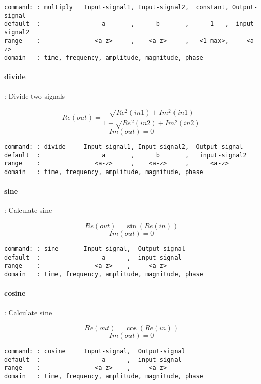 \documentclass{report}
\newcommand{\bc}{\scriptsize}
\newcommand{\ec}{\normalsize}
\begin{document}
\bc
\begin{verbatim}
command: : multiply   Input-signal1, Input-signal2,  constant, Output-signal
default  :                 a       ,      b       ,      1   ,  input-signal2
range    :               <a-z>     ,    <a-z>     ,   <1-max>,     <a-z>
domain   : time, frequency, amplitude, magnitude, phase
\end{verbatim}
\ec

\paragraph{divide}: Divide two signals

\[ Re(out) = \frac{\sqrt{ Re^{2}(in1) + Im^{2}(in1)} }{ 1 + \sqrt{Re^{2}(in2) + Im^{2}(in2)}} \]
\[ Im(out) = 0 \]

\bc
\begin{verbatim}
command: : divide     Input-signal1, Input-signal2,  Output-signal
default  :                 a       ,      b       ,   input-signal2
range    :               <a-z>     ,    <a-z>     ,      <a-z>
domain   : time, frequency, amplitude, magnitude, phase
\end{verbatim}
\ec

\paragraph{sine}: Calculate sine

\[ Re(out) = \sin (Re(in)) \]
\[ Im(out) = 0 \]

\bc
\begin{verbatim}
command: : sine       Input-signal,  Output-signal
default  :                 a      ,  input-signal 
range    :               <a-z>    ,     <a-z>
domain   : time, frequency, amplitude, magnitude, phase
\end{verbatim}
\ec

\paragraph{cosine}: Calculate sine

\[ Re(out) = \cos (Re(in)) \]
\[ Im(out) = 0 \]

\bc
\begin{verbatim}
command: : cosine     Input-signal,  Output-signal
default  :                 a      ,  input-signal 
range    :               <a-z>    ,     <a-z>
domain   : time, frequency, amplitude, magnitude, phase
\end{verbatim}
\ec
\end{document}
